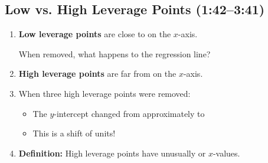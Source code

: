 \documentclass[11pt]{article}
\begin{document}
\subsection*{Low vs. High Leverage Points (1:42--3:41)}
\begin{enumerate}[resume, label=\arabic*.]
\item \textbf{Low leverage points} are close to \underline{\hspace{1.5in}} on the $x$-axis.

When removed, what happens to the regression line? \underline{\hspace{2.5in}}

\item \textbf{High leverage points} are far from \underline{\hspace{1.5in}} on the $x$-axis.

\item When three high leverage points were removed:
\begin{itemize}
\item The $y$-intercept changed from approximately \underline{\hspace{0.5in}} to \underline{\hspace{0.5in}}
\item This is a shift of \underline{\hspace{0.5in}} units!
\end{itemize}

\item \textbf{Definition:} High leverage points have unusually \underline{\hspace{1in}} or \underline{\hspace{1in}} $x$-values.
\end{enumerate}
\end{document}
